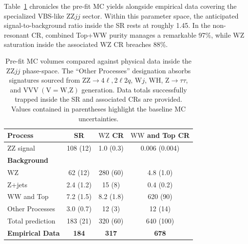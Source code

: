Table~\ref{tab:prefitYieldsZZjj} chronicles the pre-fit MC yields alongside empirical data covering the specialized VBS-like $\text{ZZ}jj$ sector. Within this parameter space, the anticipated signal-to-background ratio inside the SR rests at roughly 1.45. In the non-resonant CR, combined Top+$\text{WW}$ purity manages a remarkable 97\%, while $\text{WZ}$ saturation inside the associated $\text{WZ}$ CR breaches 88\%.


\begin{table}[htbp]
    \centering
    \small
    \renewcommand{\arraystretch}{1.2}
    \begin{tabular}{lccc}
       \hline
\textbf{Process} & \textbf{SR} & \textbf{$\text{WZ}$ CR} & \textbf{$\text{WW}$ and Top CR} \\
       \hline
        $\text{ZZ}$ signal     & 108 (12)   & 1.0 (0.3)  & 0.006 (0.004) \\
        \hline
        \hline
        \textbf{Background} &  & &  \\
        \hline        
        $\text{WZ}$            & 62 (12)    & 280 (60)   & 4.8 (1.0)     \\
        $\text{Z}$+jets        & 2.4 (1.2)  & 15 (8)     & 0.4 (0.2)     \\
        $\text{WW}$ and Top    & 7.2 (1.5)  & 8.2 (1.8)  & 620 (90)      \\
        Other Processes        & 3.0 (0.7)  & 12 (3)     & 12 (14)       \\
       \hline
        Total prediction       & 183 (21)   & 320 (60)   & 640 (100)     \\
        \hline \hline
       \textbf{Empirical Data} & \textbf{184} & \textbf{317} & \textbf{678} \\
       \hline
    \end{tabular}
    \caption{Pre-fit MC volumes compared against physical data inside the $\text{ZZ}jj$ phase-space. The ``Other Processes'' designation absorbs signatures sourced from $\text{ZZ} \to 4\ell, 2\ell 2q$, $\text{W}j$, $\text{WH}$, $\text{Z} \to \tau\tau$, and $\text{VVV}~(\text{V}=\text{W,Z})$ generation. Data totals successfully trapped inside the SR and associated CRs are provided. Values contained in parentheses highlight the baseline MC uncertainties.}
    \label{tab:prefitYieldsZZjj}
\end{table}


